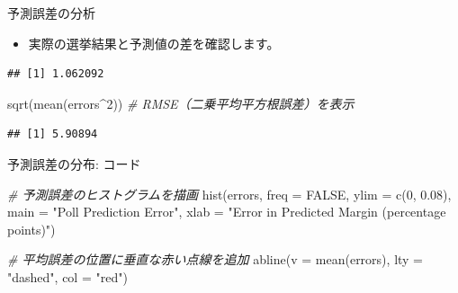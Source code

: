 \documentclass[
  ignorenonframetext,
]{beamer}
\newenvironment{Shaded}{\begin{snugshade}}{\end{snugshade}}
\newcommand{\AttributeTok}[1]{\textcolor[rgb]{0.77,0.63,0.00}{#1}}
\newcommand{\CommentTok}[1]{\textcolor[rgb]{0.56,0.35,0.01}{\textit{#1}}}
\newcommand{\ConstantTok}[1]{\textcolor[rgb]{0.00,0.00,0.00}{#1}}
\newcommand{\DecValTok}[1]{\textcolor[rgb]{0.00,0.00,0.81}{#1}}
\newcommand{\FloatTok}[1]{\textcolor[rgb]{0.00,0.00,0.81}{#1}}
\newcommand{\FunctionTok}[1]{\textcolor[rgb]{0.00,0.00,0.00}{#1}}
\newcommand{\NormalTok}[1]{#1}
\newcommand{\OtherTok}[1]{\textcolor[rgb]{0.56,0.35,0.01}{#1}}
\newcommand{\SpecialCharTok}[1]{\textcolor[rgb]{0.00,0.00,0.00}{#1}}
\newcommand{\StringTok}[1]{\textcolor[rgb]{0.31,0.60,0.02}{#1}}
\providecommand{\tightlist}{%
  \setlength{\itemsep}{0pt}\setlength{\parskip}{0pt}}
\begin{document}
\begin{frame}[fragile]{予測誤差の分析}
\protect\hypertarget{ux4e88ux6e2cux8aa4ux5deeux306eux5206ux6790}{}
\begin{itemize}
\tightlist
\item
  実際の選挙結果と予測値の差を確認します。
\end{itemize}

\scriptsize

\begin{Shaded}
\end{Shaded}

\begin{verbatim}
## [1] 1.062092
\end{verbatim}

\begin{Shaded}
\begin{Highlighting}[]
\FunctionTok{sqrt}\NormalTok{(}\FunctionTok{mean}\NormalTok{(errors}\SpecialCharTok{\^{}}\DecValTok{2}\NormalTok{))                }\CommentTok{\# RMSE（二乗平均平方根誤差）を表示}
\end{Highlighting}
\end{Shaded}

\begin{verbatim}
## [1] 5.90894
\end{verbatim}

\normalsize
\end{frame}

\begin{frame}[fragile]{予測誤差の分布: コード}
\protect\hypertarget{ux4e88ux6e2cux8aa4ux5deeux306eux5206ux5e03-ux30b3ux30fcux30c9}{}
\scriptsize

\begin{Shaded}
\begin{Highlighting}[]
\CommentTok{\# 予測誤差のヒストグラムを描画}
\FunctionTok{hist}\NormalTok{(errors, }\AttributeTok{freq =} \ConstantTok{FALSE}\NormalTok{, }\AttributeTok{ylim =} \FunctionTok{c}\NormalTok{(}\DecValTok{0}\NormalTok{, }\FloatTok{0.08}\NormalTok{),}
     \AttributeTok{main =} \StringTok{"Poll Prediction Error"}\NormalTok{,}
     \AttributeTok{xlab =} \StringTok{"Error in Predicted Margin (percentage points)"}\NormalTok{)}

\CommentTok{\# 平均誤差の位置に垂直な赤い点線を追加}
\FunctionTok{abline}\NormalTok{(}\AttributeTok{v =} \FunctionTok{mean}\NormalTok{(errors), }\AttributeTok{lty =} \StringTok{"dashed"}\NormalTok{, }\AttributeTok{col =} \StringTok{"red"}\NormalTok{)}
\end{Highlighting}
\end{Shaded}

\normalsize
\end{frame}
\end{document}
